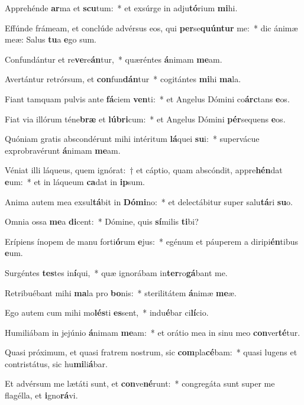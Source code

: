 \item Apprehénde \textbf{ar}ma et \textbf{scu}tum:~* et exsúrge in adju\textbf{tó}rium \textbf{mi}hi.
\item Effúnde frámeam, et conclúde advérsus eos, qui \textbf{per}se\textbf{quún}\textbf{tur} me:~* dic ánimæ meæ: Salus \textbf{tu}a \textbf{e}go sum.
\item Confundántur et re\textbf{ve}re\textbf{án}tur,~* quæréntes \textbf{á}nimam \textbf{me}am.
\item Avertántur retrórsum, et \textbf{con}fun\textbf{dán}tur~* cogitántes \textbf{mi}hi \textbf{ma}la.
\item Fiant tamquam pulvis ante \textbf{fá}ciem \textbf{ven}ti:~* et Angelus Dómini co\textbf{árc}tans \textbf{e}os.
\item Fiat via illórum téne\textbf{bræ} et \textbf{lú}\textbf{bri}cum:~* et Angelus Dómini \textbf{pér}sequens \textbf{e}os.
\item Quóniam gratis abscondérunt mihi intéritum \textbf{lá}quei \textbf{su}i:~* supervácue exprobravérunt \textbf{á}nimam \textbf{me}am.
\item Véniat illi láqueus, quem ignórat:~† et cáptio, quam abscóndit, appre\textbf{hén}dat \textbf{e}um:~* et in láqueum \textbf{ca}dat in \textbf{ip}sum.
\item Anima autem mea exsul\textbf{tá}bit in \textbf{Dó}\textbf{mi}no:~* et delectábitur super salu\textbf{tá}ri \textbf{su}o.
\item Omnia ossa \textbf{me}a \textbf{di}cent:~* Dómine, quis \textbf{sí}milis \textbf{ti}bi?
\item Erípiens ínopem de manu forti\textbf{ó}rum \textbf{e}jus:~* egénum et páuperem a diripi\textbf{én}tibus \textbf{e}um.
\item Surgéntes \textbf{tes}tes in\textbf{í}qui,~* quæ ignorábam in\textbf{ter}ro\textbf{gá}bant me.
\item Retribuébant mihi \textbf{ma}la pro \textbf{bo}nis:~* sterilitátem \textbf{á}nimæ \textbf{me}æ.
\item Ego autem cum mihi mo\textbf{lés}ti \textbf{es}sent,~* indu\textbf{é}bar ci\textbf{lí}cio.
\item Humiliábam in jejúnio \textbf{á}nimam \textbf{me}am:~* et orátio mea in sinu meo \textbf{con}ver\textbf{té}tur.
\item Quasi próximum, et quasi fratrem nostrum, sic \textbf{com}pla\textbf{cé}bam:~* quasi lugens et contristátus, sic hu\textbf{mi}li\textbf{á}bar.
\item Et advérsum me lætáti sunt, et \textbf{con}ve\textbf{né}runt:~* congregáta sunt super me flagélla, et \textbf{i}gno\textbf{rá}vi.
